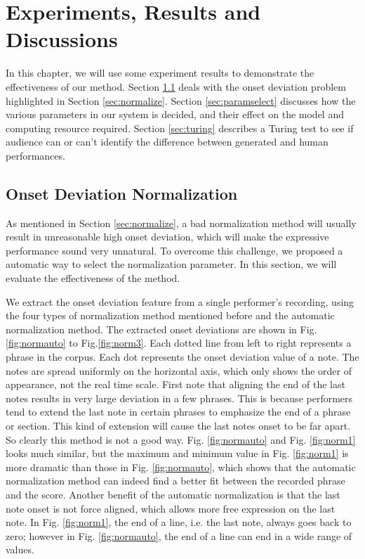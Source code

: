 \chapter{Experiments, Results and Discussions}
\label{chap:exp}
In this chapter, we will use some experiment results to demonstrate the effectiveness of our method. Section \ref{sec:onsetnormexp} deals with the onset deviation problem highlighted in Section \ref{sec:normalize}. Section \ref{sec:paramselect} discusses how the various parameters in our system is decided, and their effect on the model and computing resource required. Section \ref{sec:turing} describes a Turing test to see if audience can or can't identify the difference between generated and human performances.


\section{Onset Deviation Normalization}
\label{sec:onsetnormexp}
As mentioned in Section \ref{sec:normalize}, a bad normalization method will usually result in unreasonable high onset deviation, which will make the expressive performance sound very unnatural. To overcome this challenge, we proposed a automatic way to select the normalization parameter. In this section, we will evaluate the effectiveness of the method. 

We extract the onset deviation feature from a single performer's recording, using the four types of normalization method mentioned before and the automatic normalization method. The extracted onset deviations are shown in Fig. \ref{fig:normauto} to Fig.\ref{fig:norm3}. Each dotted line from left to right represents a phrase in the corpus. Each dot represents the onset deviation value of a note. The notes are spread uniformly  on the horizontal axis, which only shows the order of appearance, not the real time scale. First note that aligning the end of the last notes results in very large deviation in a few phrases. This is because performers tend to extend the last note in certain phrases to emphasize the end of a phrase or section. This kind of extension will cause the last notes onset to be far apart. So clearly this method is not a good way. Fig. \ref{fig:normauto} and Fig. \ref{fig:norm1} looks much similar, but the maximum and minimum value in Fig. \ref{fig:norm1} is more dramatic than those in Fig. \ref{fig:normauto}, which shows that the automatic normalization method can indeed find a better fit between the recorded phrase and the score. Another benefit of the automatic normalization is that the last note onset is not force aligned, which allows more free expression on the last note. In Fig. \ref{fig:norm1}, the end of a line, i.e. the last note, always goes back to zero; however in Fig. \ref{fig:normauto}, the end of a line can end in a wide range of values.

